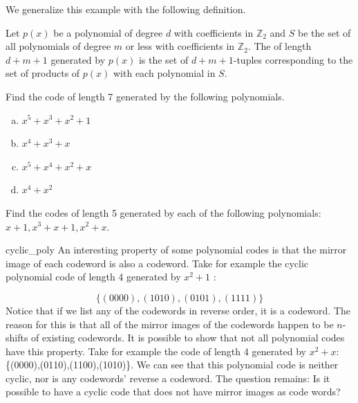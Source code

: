 We generalize this example with the following definition.

\begin {defn}{}
Let $p(x)$ be a polynomial of degree $d$ with coefficients in $\mathbb{Z}_2$ and $S$ be the set of all polynomials of degree $m$ or less with coefficients in $\mathbb{Z}_2$. The  of length $d+m+1$ generated by $p(x)$ is the set of $d+m+1$-tuples corresponding to the set of products of $p(x)$ with each polynomial in $S$.
\end {defn}

\begin {exercise}{}
Find the code of length 7 generated by the following polynomials.
\begin {enumerate}[(a)]
\item $x^5 + x^3 + x^2 + 1$
\item $x^4 + x^3 + x$
\item $x^5 + x^4 + x^2 + x$
\item $x^4 + x^2$
\end {enumerate}
\end {exercise}

\begin {exercise}{}
Find the codes of length 5 generated by each of the following polynomials: $x + 1, x^3+x+1, x^2 + x$.
\end {exercise}

\begin {example}{cyclic_poly}
An interesting property of some polynomial codes is that the mirror image of each codeword is also a codeword.  Take for example the cyclic polynomial code of length 4 generated by $x^2 + 1$ :

 \[\{(0000),(1010),(0101),(1111)\}\]  Notice that if we list any of the codewords in reverse order, it is a codeword.  The reason for this is that all of the mirror images of the codewords happen to be $n$-shifts of existing codewords.  It is possible to show that not all polynomial codes have this property.  Take for example the code of length 4 generated by $x^2 + x$: \{(0000),(0110),(1100),(1010)\}.  We can see that this polynomial code is neither cyclic, nor is any codewords' reverse a codeword.  The question remains: Is it possible to have a cyclic code that does not have mirror images as code words?
\end {example}

